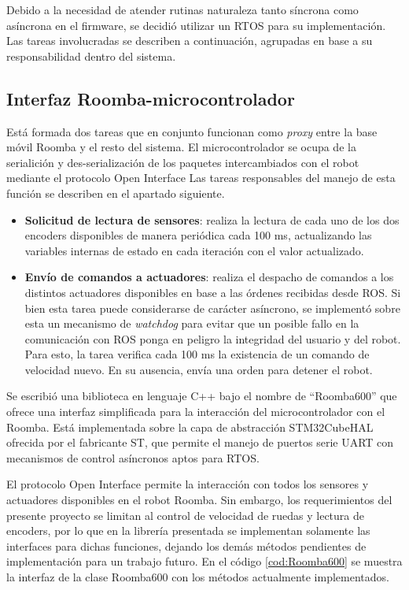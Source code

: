 Debido a la necesidad de atender rutinas naturaleza tanto síncrona como asíncrona en el firmware, se decidió utilizar un RTOS para su implementación. Las tareas involucradas se describen a continuación, agrupadas en base a su responsabilidad dentro del sistema.

\subsection{Interfaz Roomba-microcontrolador}

Está formada dos tareas que en conjunto funcionan como \textit{proxy} entre la base móvil Roomba y el resto del sistema. El microcontrolador se ocupa de la serialición y des-serialización de los paquetes intercambiados con el robot mediante el protocolo Open Interface Las tareas responsables del manejo de esta función se describen en el apartado siguiente.

\begin{itemize}
  \item \textbf{Solicitud de lectura de sensores}: realiza la lectura de cada uno de los dos encoders disponibles de manera periódica cada 100 ms, actualizando las variables internas de estado en cada iteración con el valor actualizado.
  \item \textbf{Envío de comandos a actuadores}: realiza el despacho de comandos a los distintos actuadores disponibles en base a las órdenes recibidas desde ROS. Si bien esta tarea puede considerarse de carácter asíncrono, se implementó sobre esta un mecanismo de \textit{watchdog} para evitar que un posible fallo en la comunicación con ROS ponga en peligro la integridad del usuario y del robot. Para esto, la tarea verifica cada 100 ms la existencia de un comando de velocidad nuevo. En su ausencia, envía una orden para detener el robot.
\end{itemize}

Se escribió una biblioteca en lenguaje C++ bajo el nombre de ``Roomba600'' que ofrece una interfaz simplificada para la interacción del microcontrolador con el Roomba. Está implementada sobre la capa de abstracción STM32CubeHAL ofrecida por el fabricante ST, que permite el manejo de puertos serie UART con mecanismos de control asíncronos aptos para RTOS.

El protocolo Open Interface permite la interacción con todos los sensores y actuadores disponibles en el robot Roomba. Sin embargo, los requerimientos del presente proyecto se limitan al control de velocidad de ruedas y lectura de encoders, por lo que en la librería presentada se implementan solamente las interfaces para dichas funciones, dejando los demás métodos pendientes de implementación para un trabajo futuro. En el código \ref{cod:Roomba600} se muestra la interfaz de la clase Roomba600 con los métodos actualmente implementados.


